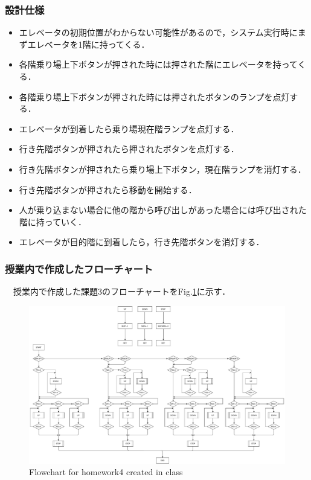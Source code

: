 \subsubsection{設計仕様}
\begin{itemize}
    \item エレベータの初期位置がわからない可能性があるので，システム実行時にまずエレベータを1階に持ってくる．
    \item 各階乗り場上下ボタンが押された時には押された階にエレベータを持ってくる．
    \item 各階乗り場上下ボタンが押された時には押されたボタンのランプを点灯する．
    \item エレベータが到着したら乗り場現在階ランプを点灯する．
    \item 行き先階ボタンが押されたら押されたボタンを点灯する．
    \item 行き先階ボタンが押されたら乗り場上下ボタン，現在階ランプを消灯する．
    \item 行き先階ボタンが押されたら移動を開始する．
    \item 人が乗り込まない場合に他の階から呼び出しがあった場合には呼び出された階に持っていく．
    \item エレベータが目的階に到着したら，行き先階ボタンを消灯する．
\end{itemize}

\subsubsection{授業内で作成したフローチャート}
　授業内で作成した課題3のフローチャートをFig.\ref{fig:kadai4_before}に示す．
\begin{figure}[H]
    \centering
    \includegraphics[width=14cm]{./fig/kadai4_before.pdf}
    \caption{Flowchart for homework4 created in class}
    \label{fig:kadai4_before}
\end{figure}

